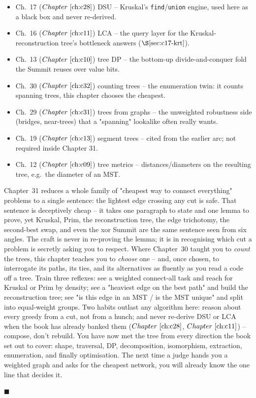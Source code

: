
\begin{itemize}[nosep]
  \item Ch.~17 (\(\chref{c28}\)) DSU -- Kruskal's \texttt{find}/\texttt{union}
        engine, used here as a black box and never re-derived.
  \item Ch.~16 (\(\chref{c11}\)) LCA -- the query layer for the Kruskal-reconstruction
        tree's bottleneck answers (\(\secref{c17-krt}\)).
  \item Ch.~13 (\(\chref{c10}\)) tree DP -- the bottom-up divide-and-conquer fold the
        Summit reuses over value bits.
  \item Ch.~30 (\(\chref{c32}\)) counting trees -- the enumeration twin: it counts
        spanning trees, this chapter chooses the cheapest.
  \item Ch.~29 (\(\chref{c31}\)) trees from graphs -- the unweighted robustness side
        (bridges, near-trees) that a "spanning" lookalike often really wants.
  \item Ch.~19 (\(\chref{c13}\)) segment trees -- cited from the earlier arc; not
        required inside Chapter 31.
  \item Ch.~12 (\(\chref{c09}\)) tree metrics -- distances/diameters on the resulting
        tree, e.g.\ the diameter of an MST.
\end{itemize}

\begin{lastword}
Chapter~31 reduces a whole family of "cheapest way to connect everything" problems
to a single sentence: the lightest edge crossing any cut is safe.  That sentence is
deceptively cheap -- it takes one paragraph to state and one lemma to prove, yet
Kruskal, Prim, the reconstruction tree, the edge trichotomy, the second-best swap,
and even the xor Summit are the same sentence seen from six angles.  The craft is
never in re-proving the lemma; it is in recognising which cut a problem is secretly
asking you to respect.  Where Chapter~30 taught you to \emph{count} the trees, this
chapter teaches you to \emph{choose} one -- and, once chosen, to interrogate its
paths, its ties, and its alternatives as fluently as you read a code off a tree.
Train three reflexes: see a weighted connect-all task and reach for Kruskal or Prim
by density; see a "heaviest edge on the best path" and build the reconstruction tree;
see "is this edge in an MST / is the MST unique" and split into equal-weight groups.
Two habits outlast any algorithm here: reason about every greedy from a cut, not from
a hunch; and never re-derive DSU or LCA when the book has already banked them
(\(\chref{c28}\), \(\chref{c11}\)) -- compose, don't rebuild.  You have now met the
tree from every direction the book set out to cover: shape, traversal, DP,
decomposition, isomorphism, extraction, enumeration, and finally optimisation.  The
next time a judge hands you a weighted graph and asks for the cheapest network,
you will already know the one line that decides it.  \begin{center}\(\blacksquare\)\end{center}
\end{lastword}
